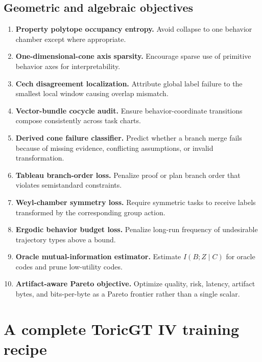 \documentclass[11pt]{article}
\numberwithin{equation}{section}
\begin{document}
\subsection{Geometric and algebraic objectives}
\begin{enumerate}[resume]
\item \textbf{Property polytope occupancy entropy.} Avoid collapse to one behavior chamber except where appropriate.
\item \textbf{One-dimensional-cone axis sparsity.} Encourage sparse use of primitive behavior axes for interpretability.
\item \textbf{Cech disagreement localization.} Attribute global label failure to the smallest local window causing overlap mismatch.
\item \textbf{Vector-bundle cocycle audit.} Ensure behavior-coordinate transitions compose consistently across task charts.
\item \textbf{Derived cone failure classifier.} Predict whether a branch merge fails because of missing evidence, conflicting assumptions, or invalid transformation.
\item \textbf{Tableau branch-order loss.} Penalize proof or plan branch order that violates semistandard constraints.
\item \textbf{Weyl-chamber symmetry loss.} Require symmetric tasks to receive labels transformed by the corresponding group action.
\item \textbf{Ergodic behavior budget loss.} Penalize long-run frequency of undesirable trajectory types above a bound.
\item \textbf{Oracle mutual-information estimator.} Estimate $I(B;Z\mid C)$ for oracle codes and prune low-utility codes.
\item \textbf{Artifact-aware Pareto objective.} Optimize quality, risk, latency, artifact bytes, and bits-per-byte as a Pareto frontier rather than a single scalar.
\end{enumerate}

\section{A complete ToricGT IV training recipe}
\end{document}
